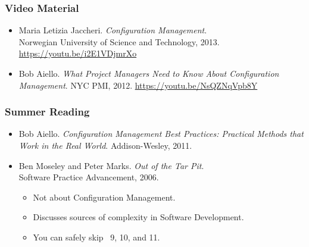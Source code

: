 \begin{frame}

\frametitle{Video Material}

\footnotesize

\begin{itemize}

\item Maria Letizia Jaccheri. \emph{Configuration Management}. \\ Norwegian
University of Science and Technology, 2013. \url{https://youtu.be/i2E1VDjmrXo}

\item Bob Aiello. \emph{What Project Managers Need to Know About Configuration
Management}. NYC PMI, 2012. \url{https://youtu.be/NsQZNqVpb8Y}

\end{itemize}

\end{frame}


\begin{frame}

\frametitle{Summer Reading}

\footnotesize

\begin{itemize}

\item Bob Aiello. \emph{Configuration Management Best Practices: Practical
Methods that Work in the Real World}. Addison-Wesley, 2011.

\end{itemize}

\vspace{\fill}

\begin{itemize}

\item Ben Moseley and Peter Marks. \emph{Out of the Tar Pit}. \\ Software
Practice Advancement, 2006.

\begin{itemize}

\footnotesize

\item Not about Configuration Management.

\item Discusses sources of complexity in Software Development.

\item You can safely skip \textsection\textsection~9, 10, and 11.

\end{itemize}

\end{itemize}

\end{frame}
